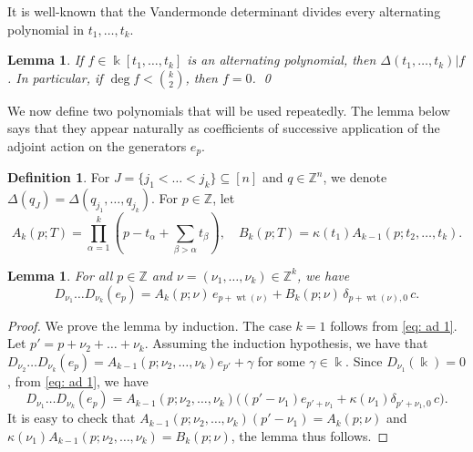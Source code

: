 \documentclass[12pt]{amsart}
\theoremstyle{plain}
\newtheorem{lemma}[theorem]{Lemma}
\theoremstyle{definition}
\newtheorem{definition}[theorem]{Definition}
\numberwithin{equation}{theorem}
\newcommand{\kk}{\Bbbk}
\newcommand{\ZZ}{\mathbb{Z}}
\newcommand{\wt}{\operatorname{wt}}
\begin{document}
It is well-known that the Vandermonde determinant divides every alternating polynomial in $t_1, \dots, t_k$.
\begin{lemma}\label{lem: div vandermonde}
    If $f \in \kk[t_1, \dots, t_k]$ is an alternating polynomial, then $\Delta (t_1, \dots, t_k) | f$. In particular, if $\deg f < \binom{k}{2}$, then $f = 0$.
    \qed
\end{lemma}

We now define two polynomials that will be used repeatedly. The lemma below says that they appear naturally as coefficients of successive application of the adjoint action on the generators $e_p$.
\begin{definition}
    For $J =\{j_1 < \dots < j_k\}\subseteq [n]$ and $q \in \ZZ^n$, we denote $\Delta(q_J) = \Delta(q_{j_1}, \dots,q_{j_k})$.  For $p \in \ZZ$, let 
    \begin{equation}
        A_k(p; T) = \prod_{\alpha=1}^k (p - t_\alpha + \sum_{\beta > \alpha} t_\beta), \quad B_k(p;T) = \kappa(t_1)A_{k-1}(p; t_2, \dots, t_k).
    \end{equation}
\end{definition}



\begin{lemma}\label{lem: term 1 ele}
    For all $p \in \ZZ$ and $\nu=(\nu_1, \dots, \nu_k) \in \ZZ^k$, we have 
    \begin{equation}
        D_{\nu_1} \dots D_{\nu_k} (e_p) = A_k(p; \nu) \, e_{p + \wt(\nu)} +  B_{k}(p; \nu) \, \delta_{p+ \wt(\nu), 0} \, c.  
    \end{equation}
\end{lemma}
\begin{proof}
    We prove the lemma by induction. The case $k=1$ follows from \eqref{eq: ad 1}. Let $p' = p+ \nu_2 + \dots + \nu_k$. Assuming the induction hypothesis, we have that $D_{\nu_2} \dots D_{\nu_k} (e_p) = A_{k-1} (p; \nu_2, \dots, \nu_k) e_{p'} + \gamma$ for some $\gamma \in \kk$. Since $D_{\nu_1}(\kk) = 0$, from \eqref{eq: ad 1}, we have 
    \[D_{\nu_1} \dots D_{\nu_k} (e_p) = A_{k-1} (p; \nu_2, \dots, \nu_k) \Big( (p' - \nu_1) e_{p' + \nu_1} + \kappa(\nu_1) \delta_{p' + \nu_1, 0} \, c \Big). \]
    It is easy to check that $A_{k-1} (p; \nu_2, \dots, \nu_k)(p' - \nu_1) = A_k (p; \nu)$ and $\kappa(\nu_1) A_{k-1} (p; \nu_2, \dots, \nu_k) = B_k (p; \nu)$, the lemma thus follows. 
\end{proof}
\end{document}

